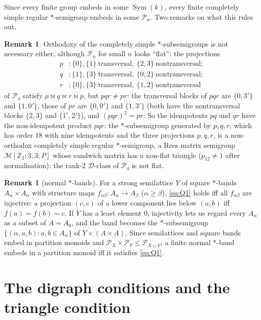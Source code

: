 \documentclass[11pt]{amsart}
\theoremstyle{definition}
\newtheorem{remark}[theorem]{Remark}
\newcommand{\D}{\mathcal{D}}
\renewcommand{\P}{\mathcal{P}}      %
\newcommand{\Sym}{\operatorname{Sym}}
\newcommand{\Z}{\mathbb{Z}}
\newcommand{\mt}{\bowtie}      %
\begin{document}
Since every finite group embeds in some $\Sym(k)$, every finite completely simple regular $*$-semigroup embeds in some $\P_n$. Two remarks on what this rules out.

\begin{remark}\label{rem:orthodox}
Orthodoxy of the completely simple $*$-subsemigroups is not necessary either, although $\P_n$ for small $n$ looks ``flat'': the projections
\begin{align*}
p&: \{0\},\{1\}\ \text{transversal},\ \{2,3\}\ \text{nontransversal};\\
q&: \{1\},\{3\}\ \text{transversal},\ \{0,2\}\ \text{nontransversal};\\
r&: \{0\},\{3\}\ \text{transversal},\ \{1,2\}\ \text{nontransversal}
\end{align*}
of $\P_4$ satisfy $p\mt q\mt r\mt p$, but $pqr\ne pr$: the transversal blocks of $pqr$ are $\{0,3'\}$ and $\{1,0'\}$, those of $pr$ are $\{0,0'\}$ and $\{1,3'\}$ (both have the nontransversal blocks $\{2,3\}$ and $\{1',2'\}$), and $(pqr)^2=pr$. So the idempotents $pq$ and $qr$ have the non-idempotent product $pqr$: the $*$-subsemigroup generated by $p,q,r$, which has order $18$ with nine idempotents and the three projections $p,q,r$, is a non-orthodox completely simple regular $*$-semigroup, a Rees matrix semigroup $\mathcal M[\Z_2;3,3;P]$ whose sandwich matrix has a non-flat triangle ($p_{12}\ne1$ after normalisation): the rank-$2$ $\D$-class of $\P_4$ is not flat.
\end{remark}

\begin{remark}[normal $*$-bands]\label{rem:normal}
For a strong semilattice $Y$ of square $*$-bands $A_\alpha\times A_\alpha$ with structure maps $f_{\alpha\beta}\colon A_\alpha\to A_\beta$ ($\alpha\ge\beta$), \eqref{eq:Q1} holds iff all $f_{\alpha\beta}$ are injective: a projection $(c,c)$ of a lower component lies below $(a,b)$ iff $f(a)=f(b)=c$. If $Y$ has a least element $0$, injectivity lets us regard every $A_\alpha$ as a subset of $A=A_0$, and the band becomes the $*$-subsemigroup $\{(\alpha,a,b): a,b\in A_\alpha\}$ of $Y\times(A\times A)$. Since semilattices and square bands embed in partition monoids and $\P_X\times\P_Y\le\P_{X\sqcup Y}$, a finite normal $*$-band embeds in a partition monoid iff it satisfies \eqref{eq:Q1}.
\end{remark}

\section{The digraph conditions and the triangle condition}\label{sec:digraph}
\end{document}
